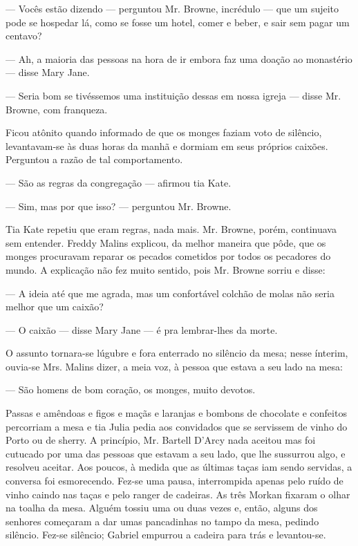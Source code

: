 --- Vocês estão dizendo --- perguntou Mr. Browne, incrédulo --- que um
sujeito pode se hospedar lá, como se fosse um hotel, comer e beber, e
sair sem pagar um centavo?

--- Ah, a maioria das pessoas na hora de ir embora faz uma doação ao
monastério --- disse Mary Jane.

--- Seria bom se tivéssemos uma instituição dessas em nossa igreja ---
disse Mr. Browne, com franqueza.

Ficou atônito quando informado de que os monges faziam voto de
silêncio, levantavam-se às duas horas da manhã e dormiam em seus
próprios caixões. Perguntou a razão de tal comportamento.

--- São as regras da congregação --- afirmou tia Kate.

--- Sim, mas por que isso? --- perguntou Mr. Browne.

Tia Kate repetiu que eram regras, nada mais. Mr. Browne, porém,
continuava sem entender. Freddy Malins explicou, da melhor maneira que
pôde, que os monges procuravam reparar os pecados cometidos por todos
os pecadores do mundo. A explicação não fez muito sentido, pois Mr.
Browne sorriu e disse:

--- A ideia até que me agrada, mas um confortável colchão de molas não
seria melhor que um caixão?

--- O caixão --- disse Mary Jane --- é pra lembrar-lhes da morte.

O assunto tornara-se lúgubre e fora enterrado no silêncio da mesa;
nesse ínterim, ouvia-se Mrs. Malins dizer, a meia voz, à pessoa que
estava a seu lado na mesa:

--- São homens de bom coração, os monges, muito devotos.

Passas e amêndoas e figos e maçãs e laranjas e bombons de chocolate e
confeitos percorriam a mesa e tia Julia pedia aos convidados que se
servissem de vinho do Porto ou de sherry. A princípio, Mr. Bartell
D'Arcy nada aceitou mas foi cutucado por uma das pessoas que estavam a
seu lado, que lhe sussurrou algo, e resolveu aceitar. Aos poucos, à
medida que as últimas taças iam sendo servidas, a conversa foi
esmorecendo. Fez-se uma pausa, interrompida apenas pelo ruído de
vinho caindo nas taças e pelo ranger de cadeiras. As três Morkan
fixaram o olhar na toalha da mesa. Alguém tossiu uma ou duas vezes e,
então, alguns dos senhores começaram a dar umas pancadinhas no tampo
da mesa, pedindo silêncio. Fez-se silêncio; Gabriel empurrou a cadeira
para trás e levantou-se.

